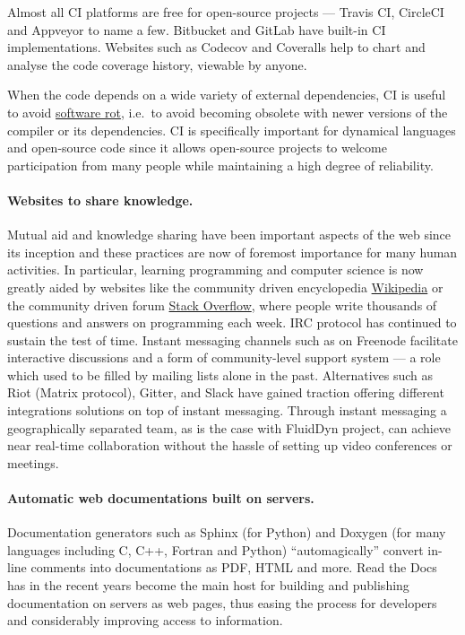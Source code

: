 Almost all CI platforms are free for open-source projects --- Travis CI,
CircleCI and Appveyor %
to name a few. Bitbucket and GitLab have built-in CI
implementations.  Websites such as Codecov and Coveralls help to chart and
analyse the code coverage history, viewable by anyone.

When the code depends on a wide variety of external dependencies, CI is useful
to avoid \href{https://en.wikipedia.org/wiki/Software\_rot}{software rot},
i.e.\ to avoid becoming obsolete with newer versions of the compiler or its
dependencies.  CI is specifically important for dynamical
languages and open-source code since it allows open-source projects to welcome
participation from many people while maintaining a high degree of reliability.

\paragraph{Websites to share knowledge.} Mutual aid and knowledge sharing
have been important aspects of the web since its inception and these practices
are now of foremost importance for many human activities.
%
In particular, learning programming and computer science is now greatly aided
by websites like the community driven encyclopedia
\href{https://www.wikipedia.org/}{Wikipedia} or the community driven forum
\href{https://stackoverflow.com/}{Stack Overflow}, where people write thousands
of questions and answers on programming each week.
IRC protocol has continued to sustain the test of time. Instant messaging
channels such as  on Freenode facilitate interactive
discussions and a form of community-level support system --- a role which used
to be filled by mailing lists alone in the past. Alternatives such as Riot
(Matrix protocol), Gitter, and Slack have gained traction offering different
integrations solutions on top of instant messaging.
%
Through instant messaging a geographically separated team, as is the case with
FluidDyn project, can achieve near real-time collaboration without the hassle
of setting up video conferences or meetings.

\paragraph{Automatic web documentations built on servers.}  Documentation
generators such as Sphinx (for Python) and Doxygen (for many languages
including C, C++, Fortran and Python) ``automagically'' convert in-line
comments into documentations as PDF, HTML and more. Read the Docs has in the
recent years become the main host for building and publishing documentation on
servers as web pages, thus easing the process for developers and considerably
improving access to information.

